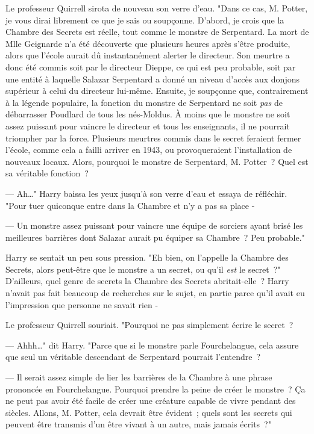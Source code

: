 Le professeur Quirrell sirota de nouveau son verre d'eau. "Dans ce cas, M. Potter, je vous dirai librement ce que je sais ou soupçonne. D'abord, je crois que la Chambre des Secrets est réelle, tout comme le monstre de Serpentard. La mort de Mlle Geignarde n'a été découverte que plusieurs heures après s'être produite, alors que l'école aurait dû instantanément alerter le directeur. Son meurtre a donc été commis soit par le directeur Dieppe, ce qui est peu probable, soit par une entité à laquelle Salazar Serpentard a donné un niveau d'accès aux donjons supérieur à celui du directeur lui-même. Ensuite, je soupçonne que, contrairement à la légende populaire, la fonction du monstre de Serpentard ne soit \emph{pas} de débarrasser Poudlard de tous les nés-Moldus. À moins que le monstre ne soit assez puissant pour vaincre le directeur et tous les enseignants, il ne pourrait triompher par la force. Plusieurs meurtres commis dans le secret feraient fermer l'école, comme cela a failli arriver en 1943, ou provoqueraient l'installation de nouveaux locaux. Alors, pourquoi le monstre de Serpentard, M. Potter~? Quel est sa véritable fonction~?

--- Ah…" Harry baissa les yeux jusqu'à son verre d'eau et essaya de réfléchir. "Pour tuer quiconque entre dans la Chambre et n'y a pas sa place -

--- Un monstre assez puissant pour vaincre une équipe de sorciers ayant brisé les meilleures barrières dont Salazar aurait pu équiper sa Chambre~? Peu probable."

Harry se sentait un peu sous pression. "Eh bien, on l'appelle la Chambre des Secrets, alors peut-être que le monstre a un secret, ou qu'il \emph{est} le secret~?" D'ailleurs, quel genre de secrets la Chambre des Secrets abritait-elle~? Harry n'avait pas fait beaucoup de recherches sur le sujet, en partie parce qu'il avait eu l'impression que personne ne savait rien -

Le professeur Quirrell souriait. "Pourquoi ne pas simplement écrire le secret~?

--- Ahhh…" dit Harry. "Parce que si le monstre parle Fourchelangue, cela assure que seul un véritable descendant de Serpentard pourrait l'entendre~?

--- Il serait assez simple de lier les barrières de la Chambre à une phrase prononcée en Fourchelangue. Pourquoi prendre la peine de créer le monstre~? Ça ne peut pas avoir été facile de créer une créature capable de vivre pendant des siècles. Allons, M. Potter, cela devrait être évident~; quels sont les secrets qui peuvent être transmis d'un être vivant à un autre, mais jamais écrits~?"

